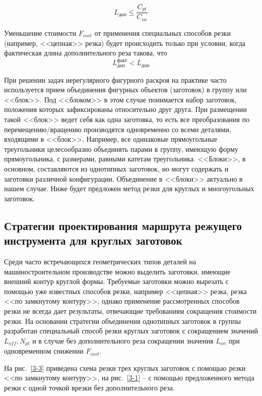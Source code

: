 \documentclass[11pt,twoside,openany]{report}
\begin{document}
\begin{equation}
  L_\text{доп} \leqslant \frac{C_{pt}}{C_{on}}
  \label{l-dop}
\end{equation}

Уменьшение стоимости
$F_{cost}$
от применения специальных способов резки
(например, <<цепная>> резка)
будет происходить только при условии,
когда фактическая длина дополнительного реза
такова, что
\begin{equation}
  L_\text{доп}^\text{факт} < L_\text{доп}
  \label{l-fact-dop}
\end{equation}

При решении задач нерегулярного фигурного раскроя
на практике часто используется прием объединения
фигурных объектов (заготовок)
в группу или <<блок>>.
Под <<блоком>> в этом случае понимается набор заготовок,
положения которых зафиксированы относительно друг друга.
При размещении такой <<блок>> ведет себя как одна заготовка,
то есть все преобразования по перемещению/вращению производятся
одновременно со всеми деталями, входящими в <<блок>>.
Например, все одинаковые прямоугольные треугольники
целесообразно объединять парами в группу, имеющую форму прямоугольника,
с размерами, равными катетам треугольника.
<<Блоки>>, в основном, составляются из однотипных заготовок,
но могут содержать и заготовки различной конфигурации.
Объединение в <<блоки>> актуально в нашем случае.
Ниже будет предложен метод резки для круглых и многоугольных заготовок.

\subsection{
  Стратегии проектирования маршрута режущего инструмента
  для круглых заготовок
}

Среди часто встречающихся геометрических типов деталей
на машиностроительном производстве можно выделить заготовки,
имеющие внешний контур круглой формы.
Требуемые заготовки можно вырезать с
помощью уже известных способов резки,
например <<цепная>> резка, резка <<по замкнутому контуру>>,
однако применение рассмотренных способов резки не всегда
дает результаты, отвечающие требованиям сокращения стоимости резки.
На основании стратегии объединения однотипных заготовок
в группы разработан специальный способ резки круглых
заготовок с сокращением значений
$L_{off}, N_{pt}$
и в случае без дополнительного реза сокращении значения
$L_{on}$
при одновременном снижении
$F_{cost}$.

На рис.~\ref{3-3}
приведена схема резки трех круглых заготовок
с помощью резки <<по замкнутому контуру>>,
на рис.~\ref{3-1}
-- с помощью предложенного метода резки
с одной точкой врезки без дополнительного реза.
\end{document}
